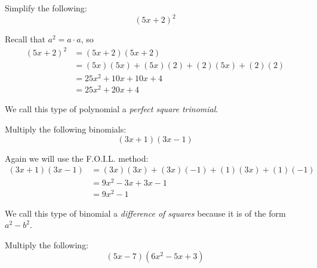 \begin{exercise}
Simplify the following:
\[
(5x+2)^2
\]
\end{exercise}
\begin{solution}[2in]
Recall that $a^2=a\cdot a$, so
\begin{align*}
(5x+2)^2&=(5x+2)(5x+2)\\
&=(5x)(5x)+(5x)(2)+(2)(5x)+(2)(2)\\
&=25x^2+10x+10x+4\\
&=25x^2+20x+4
\end{align*}
\begin{note}
We call this type of polynomial a \emph{perfect square trinomial}.
\end{note}
\end{solution}
\vspace{0.5em}
\begin{exercise}
Multiply the following binomials:
\[
(3x+1)(3x-1)
\]
\end{exercise}
\begin{solution}[2in]
Again we will use the F.O.I.L. method:
\begin{align*}
(3x+1)(3x-1)&=(3x)(3x)+(3x)(-1)+(1)(3x)+(1)(-1)\\
&=9x^2-3x+3x-1\\
&=9x^2-1
\end{align*}
\begin{note}
We call this type of binomial a \emph{difference of squares} because
it is of the form $a^2-b^2$.
\end{note}
\end{solution}
\vspace{0.5em}
\ifprintanswers\else\newpage\fi
\begin{exercise}
Multiply the following:
\[
(5x-7)(6x^2-5x+3)
\]
\end{exercise}
